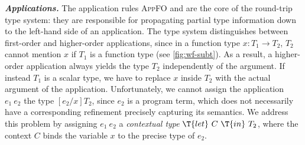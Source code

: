 \documentclass[10pt,preprint]{sigplanconf-pldi16}
\theoremstyle{definition}
\newcommand{\custompar}[1]{\parskip 0pt \textbf{\textit{#1}}}
\newcommand{\App}[2]{{#1}\ {#2}}
\newcommand{\funT}[3]{{#1}\colon {#2} \to {#3}}
\newcommand{\contT}[2]{\T{let}\ {#1}\ \T{in}\ {#2}}
\begin{document}
\custompar{Applications.}
The application rules \textsc{AppFO} and  are the core of the round-trip type system:
they are responsible for propagating partial type information down to the left-hand side of an application.
The type system distinguishes between first-order and higher-order applications,
since in a function type $\funT{x}{T_1}{T_2}$, $T_2$ cannot mention $x$ if $T_1$ is a function type (see \autoref{fig:wf-subt}).
As a result, a higher-order application always yields the type $T_2$ independently of the argument.
If instead $T_1$ is a scalar type, we have to replace $x$ inside $T_2$ with the actual argument of the application.
Unfortunately, we cannot assign the application $\App{e_1}{e_2}$ the type $[e_2/x]T_2$,
since $e_2$ is a program term, which does not necessarily have a corresponding refinement precisely capturing its semantics.
We address this problem by assigning $\App{e_1}{e_2}$ a \emph{contextual type} $\contT{C}{T_2}$,
where the context $C$ binds the variable $x$ to the precise type of $e_2$.
\end{document}
